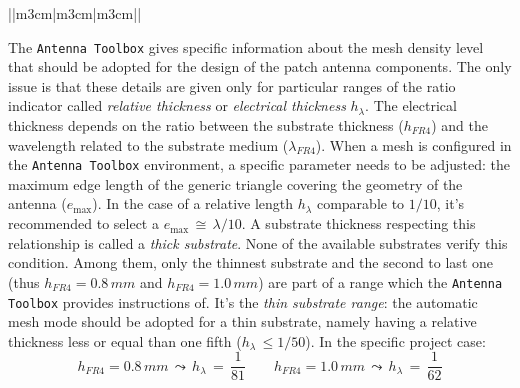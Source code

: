 \documentclass[12pt,a4paper]{article}
\begin{document}
{\begin{table}[h]
\begin{center}
{\begin{tabular}{||m{3cm}|m{3cm}|m{3cm}||}
			\end{tabular}}\end{center}\end{table}
\FloatBarrier
The \texttt{\color{Mahogany}Antenna Toolbox} gives specific
information about the mesh density level that should be adopted for the design of the patch antenna components. The only issue is that these details are given only for particular ranges of the ratio indicator called \emph{relative thickness} or \emph{electrical thickness} $h_{\lambda}$. The electrical thickness depends on the ratio between the substrate thickness ($h_{FR4}$) and the wavelength related to the substrate medium ($\lambda_{FR4}$). When a mesh is configured in the \texttt{\color{Mahogany}Antenna Toolbox} environment, a specific parameter needs to be adjusted: the maximum edge length of the generic triangle covering the geometry of the antenna ($e_{\max}$). In the case of a relative length $h_\lambda$ comparable to $1/10$, it's recommended to select a $e_{\max}\,\cong\,\lambda/10$. A substrate thickness respecting this relationship is called a \emph{thick substrate}. None of the available substrates verify this condition. Among them, only the thinnest substrate and the second to last one (thus $h_{FR4}=0.8\,mm$ and $h_{FR4}=1.0\,mm$) are part of a range which the \texttt{\color{Mahogany}Antenna Toolbox} provides instructions of. It's the \emph{thin substrate range}: the automatic mesh mode should be adopted for a thin substrate, namely having a relative thickness less or equal than one fifth ($h_\lambda\,\leq{1/50}$). In the specific project case: 
\begin{equation}
	h_{FR4}=0.8\,mm\,\leadsto\,h_{\lambda}\,=\,\frac{1}{81}\qquad 	h_{FR4}=1.0\,mm\,\leadsto\,h_{\lambda}\,=\,\frac{1}{62}
\end{equation}
\begin{center}
\end{center}

}
\end{document}
